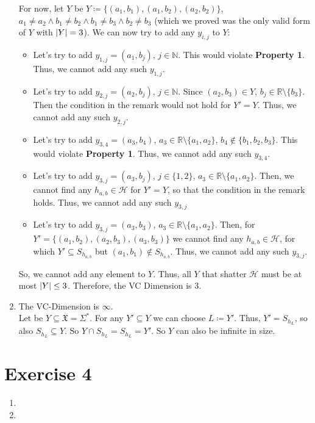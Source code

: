 \documentclass[12pt]{article}
\DeclarePairedDelimiter\abs{\lvert}{\rvert}
\begin{document}
\begin{enumerate}[label=(\alph*)]
			For now, let $Y$ be $Y \coloneqq \{(a_1, b_1), (a_1, b_2), (a_2, b_2)\}$, $a_1 \neq a_2 \land b_1 \neq b_2 \land b_1 \neq b_3 \land b_2 \neq b_3$ (which we proved was the only valid form of $Y$ with $\abs{Y} = 3$). We can now try to add any $y_{i,j}$ to $Y$:
			\begin{itemize}
				\item	Let's try to add $y_{1,j} = (a_1, b_j)$, $j \in \mathbb{N}$. This would violate \textbf{Property 1}. Thus, we cannot add any such $y_{1,j}$.

				\item	Let's try to add $y_{2,j} = (a_2, b_j)$, $j \in \mathbb{N}$. Since $(a_2, b_3) \in Y$, $b_j \in \mathbb{R}\setminus\{b_3\}$. Then the condition in the remark would not hold for $Y' = Y$. Thus, we cannot add any such $y_{2,j}$.

				\item	Let's try to add $y_{3,4} = (a_3, b_4)$, $a_3 \in \mathbb{R}\setminus\{a_1, a_2\}$, $b_4 \not\in \{b_1, b_2, b_3\}$. This would violate \textbf{Property 1}. Thus, we cannot add any such $y_{3,4}$.
				\item	Let's try to add $y_{3,j} = (a_3, b_j)$, $j \in \{1,2\}$, $a_3 \in \mathbb{R}\setminus\{a_1, a_2\}$. Then, we cannot find any $h_{a,b} \in \mathcal{H}$ for $Y' = Y$, so that the condition in the remark holds. Thus, we cannot add any such $y_{3,j}$
				\item	Let's try to add $y_{3,j} = (a_3, b_3)$, $a_3 \in \mathbb{R}\setminus\{a_1, a_2\}$. Then, for $Y' = \{(a_1, b_2), (a_2,b_3), (a_3, b_3)\}$ we cannot find any $h_{a,b} \in \mathcal{H}$, for which $Y' \subseteq S_{h_{a,b}}$ but $(a_1, b_1) \not\in S_{h_{a,b}}$. Thus, we cannot add any such $y_{3,j}$.
			\end{itemize}
			So, we cannot add any element to $Y$. Thus, all $Y$ that shatter $\mathcal{H}$ must be at most $\abs{Y} \leq 3$. Therefore, the VC Dimension is $3$.
	\item	The VC-Dimension is $\infty$. \\
			Let be $Y \subseteq \mathfrak{X} = \Sigma^*$. For any $Y' \subseteq Y$ we can choose $L \coloneqq Y'$. Thus, $Y' = S_{h_L}$, so also $S_{h_L} \subseteq Y$. So $Y \cap S_{h_L} = S_{h_L} = Y'$. So $Y$ can also be infinite in size.
\end{enumerate}

\section*{Exercise 4}
\begin{enumerate}[label=(\alph*)]
	\item
	\item
\end{enumerate}
\end{document}
